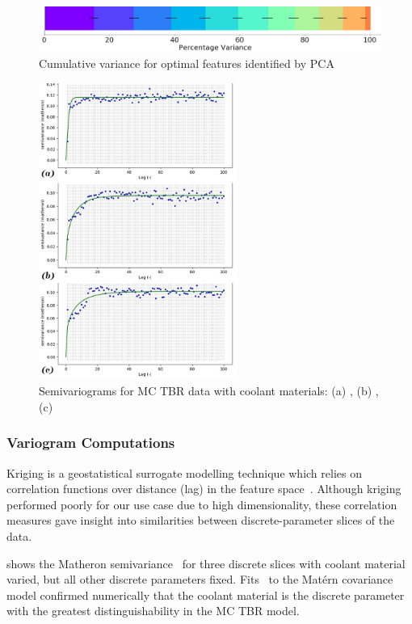 \begin{figure}[h]
	\centering
	\includegraphics[width=0.6\linewidth]{fig2_pca.jpg}
	\caption{Cumulative variance for optimal features identified by PCA}
	\label{fig:pca}
\end{figure}

\begin{figure}
	\centering
	\hspace*{-.3\columnsep}\includegraphics[width=0.58\textwidth]{fig3_allvar.jpg}
	\caption{Semivariograms for MC TBR data with coolant materials: (a) ,
	(b) , (c) }
	\label{fig:var}
\end{figure}

\subsubsection{Variogram Computations}

Kriging is a geostatistical surrogate modelling technique which relies on
correlation functions over distance (lag) in the feature space~\cite{Bouhlel2018}. Although kriging performed poorly for our use case due to high dimensionality, these correlation measures gave insight into similarities between discrete-parameter slices of the data.

 shows the Matheron semivariance~\cite{Matheron1963} for three discrete slices with coolant material varied, but all other discrete parameters fixed. Fits~\cite{KrigingFig} to the Matérn covariance model confirmed numerically that the coolant material is the discrete parameter with the greatest distinguishability in the MC TBR model. 


